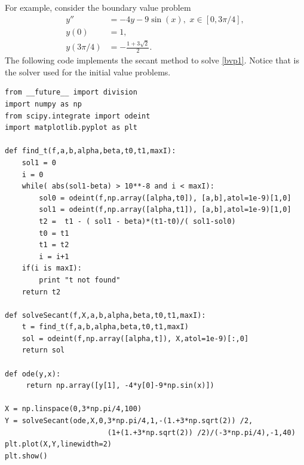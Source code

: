 For example, consider the boundary value problem
\begin{equation}
\begin{split}
\label{bvp1}
y'' &= -4y -9\sin(x), \,\, x \in [0,3\pi/4],\\
y(0) &= 1, \\
y(3 \pi/4) &= -\frac{1+3\sqrt{2}}{2}.
\end{split}
\end{equation}
The following code implements the secant method to solve \eqref{bvp1}. Notice that  is the solver used for the initial value problems.

\begin{lstlisting}
from __future__ import division
import numpy as np
from scipy.integrate import odeint
import matplotlib.pyplot as plt

def find_t(f,a,b,alpha,beta,t0,t1,maxI):
	sol1 = 0
	i = 0
	while( abs(sol1-beta) > 10**-8 and i < maxI):
		sol0 = odeint(f,np.array([alpha,t0]), [a,b],atol=1e-9)[1,0]
		sol1 = odeint(f,np.array([alpha,t1]), [a,b],atol=1e-9)[1,0]
		t2 =  t1 - ( sol1 - beta)*(t1-t0)/( sol1-sol0)
		t0 = t1
		t1 = t2
		i = i+1
	if(i is maxI):
		print "t not found"
	return t2

def solveSecant(f,X,a,b,alpha,beta,t0,t1,maxI):
    t = find_t(f,a,b,alpha,beta,t0,t1,maxI)
    sol = odeint(f,np.array([alpha,t]), X,atol=1e-9)[:,0]
    return sol

def ode(y,x): 
     return np.array([y[1], -4*y[0]-9*np.sin(x)])

X = np.linspace(0,3*np.pi/4,100)
Y = solveSecant(ode,X,0,3*np.pi/4,1,-(1.+3*np.sqrt(2)) /2,
						(1+(1.+3*np.sqrt(2)) /2)/(-3*np.pi/4),-1,40)
plt.plot(X,Y,linewidth=2)
plt.show()
\end{lstlisting}


% 
% 


